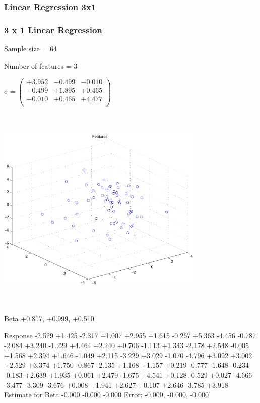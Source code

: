 \documentclass[9pt]{article}
\theoremstyle{plain}
\theoremstyle{definition}
\theoremstyle{remark}
\numberwithin{equation}{section}
\begin{document}
\subsubsection{Linear Regression 3x1}
\subsubsection{3 x 1 Linear Regression}
Sample size = 64

Number of features = 3

$\sigma = \left(
\begin{array}{
ccc}
+3.952 & -0.499 & -0.010 \\
-0.499 & +1.895 & +0.465 \\
-0.010 & +0.465 & +4.477 \\
\end{array}
\right)$ \newline 

\includegraphics[width=10.0cm,height=10.0cm]{regression_features.pdf}

Beta
+0.817, +0.999, +0.510

Response
-2.529
+1.425
-2.317
+1.007
+2.955
+1.615
-0.267
+5.363
-4.456
-0.787
-2.084
+3.240
-1.229
+4.464
+2.240
+0.706
-1.113
+1.343
-2.178
+2.548
-0.005
+1.568
+2.394
+1.646
-1.049
+2.115
-3.229
+3.029
-1.070
-4.796
+3.092
+3.002
+2.529
+3.374
+1.750
-0.867
-2.135
+1.168
+1.157
+0.219
-0.777
-1.648
-0.234
-0.183
+2.639
+1.935
+0.061
+2.479
-1.675
+4.541
+0.128
-0.529
+0.027
-4.666
-3.477
-3.309
-3.676
+0.008
+1.941
+2.627
+0.107
+2.646
-3.785
+3.918
Estimate for Beta
-0.000
-0.000
-0.000
Error:
-0.000, -0.000, -0.000
\end{document}
